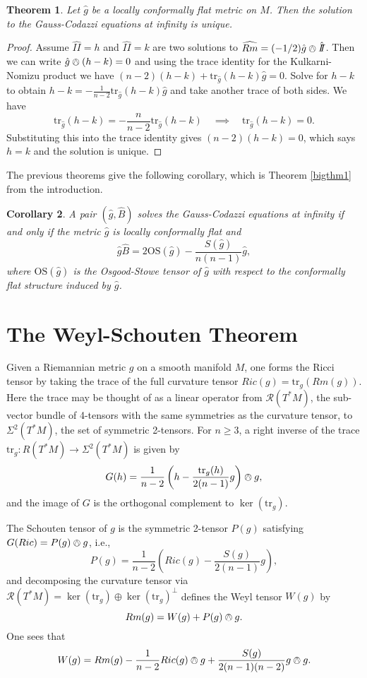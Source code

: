 \documentclass{amsart}
\newcommand{\two}{I\!\!I}
\newcommand{\tr}{\mathrm{tr}}
\newtheorem{thm}{Theorem}[section]
\newtheorem{cor}[thm]{Corollary}
\begin{document}
\begin{thm}
Let $\hat{g}$ be a locally conformally flat metric on $M$.
Then the solution to the Gauss-Codazzi equations at infinity is unique.
\end{thm}

\begin{proof}
Assume $\hat{\two} = h$ and $\hat{\two} = k$ are two solutions to $\widehat{Rm} = (-1/2)\hat{g}\owedge\hat{\two}$.
Then we can write $\hat{g}\owedge (h-k) = 0$ and using the trace identity for the Kulkarni-Nomizu product we have $(n-2)(h-k) + \tr_{\hat{g}}(h-k)\hat{g} = 0$.
Solve for $h-k$ to obtain $h-k = -\frac{1}{n-2}\tr_{\hat{g}}(h-k)\hat{g}$ and take another trace of both sides.
We have
\[
\tr_{\hat{g}}(h-k) = -\frac{n}{n-2}\tr_{\hat{g}}(h-k) \quad \implies \quad \tr_{\hat{g}}(h-k) = 0.
\]
Substituting this into the trace identity gives $(n-2)(h-k) = 0$, which says $h=k$ and the solution is unique.
\end{proof}



The previous theorems give the following corollary, which is Theorem \ref{bigthm1} from the introduction. 
\begin{cor}
\label{MainThm}
A pair $(\hat{g},\hat{B})$ solves the Gauss-Codazzi equations at infinity if and only if the metric $\hat{g}$ is locally conformally flat and
\[
\hat{g} \hat{B} = 2\mathrm{OS}(\hat{g}) - \frac{S(\hat{g})}{n(n-1)}\hat{g},
\]
where $\mathrm{OS}(\hat{g})$ is the Osgood-Stowe tensor of $\hat{g}$ with respect to the conformally flat structure induced by $\hat{g}$.
\end{cor}


\section{The Weyl-Schouten Theorem}

Given a Riemannian metric $g$ on a smooth manifold $M$, one forms the Ricci tensor by taking the trace of the full curvature tensor $Ric(g) = \tr_g(Rm(g))$.
Here the trace may be thought of as a linear operator from $\mathcal{R}(T^*M)$, the sub-vector bundle of 4-tensors with the same symmetries as the curvature tensor, to $\Sigma^2(T^*M)$, the set of symmetric 2-tensors.
For $n\geq 3$, a right inverse of the trace $\tr_g: R(T^*M) \to \Sigma^2(T^*M)$ is given by 
\[
G(h) = \frac{1}{n-2}\left( h - \frac{\tr_g(h)}{2(n-1)} g \right) \owedge g,
\]
and the image of $G$ is the orthogonal complement to $\ker(\tr_g)$.

The Schouten tensor of $g$ is the symmetric 2-tensor $P(g)$ satisfying $G(Ric) = P(g) \owedge g$, i.e., 
\[
P(g) = \frac{1}{n-2}\left( Ric(g) - \frac{S(g)}{2(n-1)} g \right),
\]
and decomposing the curvature tensor via $\mathcal{R}(T^*M) = \ker(\tr_g) \oplus \ker(\tr_g)^\perp$ defines the Weyl tensor $W(g)$ by 
\begin{equation}
\label{Weyl}
Rm(g) = W(g) + P(g)\owedge g.
\end{equation}
One sees that 
\[
W(g) = Rm(g) - \frac{1}{n-2}Ric(g) \owedge g + \frac{S(g)}{2(n-1)(n-2)} g \owedge g.
\]
\end{document}
